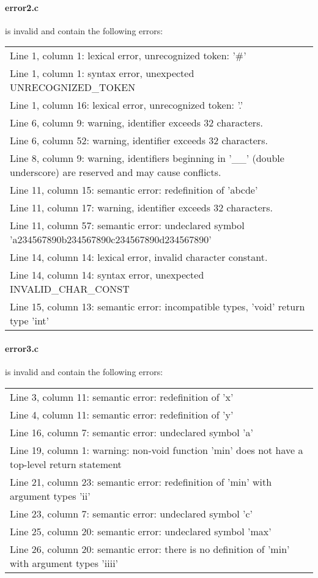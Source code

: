 \paragraph{error2.c} is invalid and contain the following errors:

\begin{tabular}{l}
Line 1, column 1: lexical error, unrecognized token: '\#' \\
Line 1, column 1: syntax error, unexpected UNRECOGNIZED\_TOKEN  \\
Line 1, column 16: lexical error, unrecognized token: '.'  \\
Line 6, column 9: warning, identifier exceeds 32 characters.  \\
Line 6, column 52: warning, identifier exceeds 32 characters.  \\
Line 8, column 9: warning, identifiers beginning in '\_\_' (double underscore) are reserved and may cause conflicts.  \\
Line 11, column 15: semantic error: redefinition of 'abcde'  \\
Line 11, column 17: warning, identifier exceeds 32 characters.  \\
Line 11, column 57: semantic error: undeclared symbol 'a234567890b234567890c234567890d234567890'  \\
Line 14, column 14: lexical error, invalid character constant.  \\
Line 14, column 14: syntax error, unexpected INVALID\_CHAR\_CONST  \\
Line 15, column 13: semantic error: incompatible types, 'void' return type 'int'  \\
\end{tabular}


\paragraph{error3.c} is invalid and contain the following errors:

\begin{tabular}{l}
Line 3, column 11: semantic error: redefinition of 'x' \\
Line 4, column 11: semantic error: redefinition of 'y'  \\
Line 16, column 7: semantic error: undeclared symbol 'a'  \\
Line 19, column 1: warning: non-void function 'min' does not have a top-level return statement  \\
Line 21, column 23: semantic error: redefinition of 'min' with argument types 'ii'  \\
Line 23, column 7: semantic error: undeclared symbol 'c'  \\
Line 25, column 20: semantic error: undeclared symbol 'max'  \\
Line 26, column 20: semantic error: there is no definition of 'min' with argument types 'iiii'  \\
\end{tabular}

